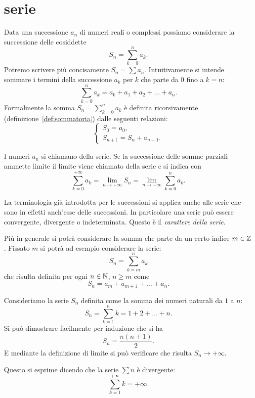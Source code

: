 \chapter{serie}

Data una successione $a_n$ di numeri reali o complessi
possiamo considerare la successione
delle cosiddette 
\[
  S_n = \sum_{k=0}^{n} a_k.
\]
Potremo scrivere più concisamente $S_n = \sum a_n$.
Intuitivamente si intende sommare i termini della successione $a_k$
per $k$ che parte da $0$ fino a $k=n$:
\[
  \sum_{k=0}^n a_k = a_0 + a_1 + a_2 + \dots + a_n.
\]
Formalmente la somma $S_n=\displaystyle \sum_{k=0}^n a_k$
è definita ricorsivamente (definizione~\ref{def:sommatoria})
dalle seguenti relazioni:
\[
  \begin{cases}
    S_0 = a_0, \\
    S_{n+1} = S_n + a_{n+1}.
  \end{cases}
\]

I numeri $a_n$ si chiamano  della serie.
%
Se la successione delle somme parziali ammette limite il limite viene chiamato
%
della serie e si indica con
\[
  \sum_{k=0}^{+\infty} a_k = \lim_{n\to +\infty} S_n = \lim_{n\to+\infty} \sum_{k=0}^n a_k.
\]

La terminologia già introdotta per le successioni si applica anche alle
serie che sono in effetti anch'esse delle successioni.
In particolare una serie può essere convergente, divergente o indeterminata.
Questo è il \emph{carattere della serie}.
%
%
%

Più in generale si potrà considerare la somma che parte da un certo
indice $m\in \mathbb Z$.
Fissato $m$ si potrà ad esempio considerare la serie:
\[
  S_n = \sum_{k=m}^n a_k
\]
che risulta definita per ogni $n\in\mathbb N$, $n\ge m$
come
\[
  S_n = a_m + a_{m+1} + \dots + a_n.
\]

\begin{example}
Consideriamo la serie $S_n$ definita
come la somma dei numeri naturali da $1$ a $n$:
\[
  S_n = \sum_{k=1}^n k = 1 + 2 + \dots + n.
\]
Si può dimostrare facilmente per induzione che si ha
\[
  S_n = \frac{n(n+1)}{2}.
\]
E mediante la definizione di limite si può verificare che
risulta $S_n \to +\infty$.

Questo si esprime dicendo che la serie $\sum n$ è divergente:
\[
     \sum_{k=1}^{+\infty} k = +\infty.
\]
\end{example}


